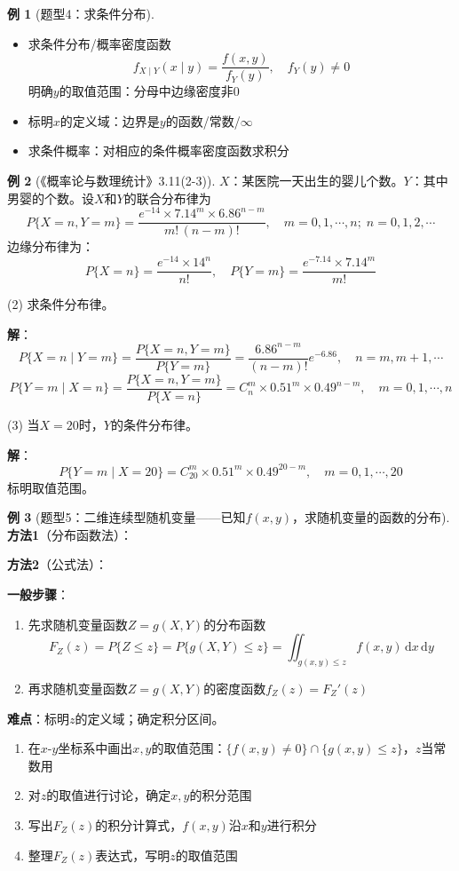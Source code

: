\documentclass[11pt,a4paper]{report}
\theoremstyle{definition}
\newtheorem{example}{例}[chapter]
\theoremstyle{plain}
\begin{document}
\begin{example}[题型4：求条件分布]
\begin{itemize}[leftmargin=2em]
    \item 求条件分布/概率密度函数
    \[
    f_{X\mid Y}(x\mid y)=\frac{f(x,y)}{f_Y(y)},\quad f_Y(y)\neq 0
    \]
    明确\(y\)的取值范围：分母中边缘密度非0
    \item 标明\(x\)的定义域：边界是\(y\)的函数/常数/\(\infty\)
    \item 求条件概率：对相应的条件概率密度函数求积分
\end{itemize}
\end{example}

\begin{example}[《概率论与数理统计》3.11(2-3)]
\(X\)：某医院一天出生的婴儿个数。\(Y\)：其中男婴的个数。设\(X\)和\(Y\)的联合分布律为
\[
P\{X=n,Y=m\}=\frac{e^{-14}\times 7.14^m\times 6.86^{n-m}}{m!\,(n-m)!},\quad m=0,1,\cdots,n;\;n=0,1,2,\cdots
\]
边缘分布律为：
\[
P\{X=n\}=\frac{e^{-14}\times 14^n}{n!},\quad P\{Y=m\}=\frac{e^{-7.14}\times 7.14^m}{m!}
\]

(2) 求条件分布律。

\textbf{解}：
\[
P\{X=n\mid Y=m\}=\frac{P\{X=n,Y=m\}}{P\{Y=m\}}=\frac{6.86^{n-m}}{(n-m)!}e^{-6.86},\quad n=m,m+1,\cdots
\]
\[
P\{Y=m\mid X=n\}=\frac{P\{X=n,Y=m\}}{P\{X=n\}}=C_n^m\times 0.51^m\times 0.49^{n-m},\quad m=0,1,\cdots,n
\]

(3) 当\(X=20\)时，\(Y\)的条件分布律。

\textbf{解}：
\[
P\{Y=m\mid X=20\}=C_{20}^m\times 0.51^m\times 0.49^{20-m},\quad m=0,1,\cdots,20
\]
标明取值范围。
\end{example}

\begin{example}[题型5：二维连续型随机变量——已知\(f(x,y)\)，求随机变量的函数的分布]

\textbf{方法1}（分布函数法）：

\textbf{方法2}（公式法）：

\textbf{一般步骤}：
\begin{enumerate}[label=\arabic*.,leftmargin=2em]
    \item 先求随机变量函数\(Z=g(X,Y)\)的分布函数
    \[
    F_Z(z)=P\{Z\leq z\}=P\{g(X,Y)\leq z\}=\iint_{g(x,y)\leq z}f(x,y)\,\mathrm{d}x\,\mathrm{d}y
    \]
    \item 再求随机变量函数\(Z=g(X,Y)\)的密度函数\(f_Z(z)=F_Z'(z)\)
\end{enumerate}

\textbf{难点}：标明\(z\)的定义域；确定积分区间。
\begin{enumerate}[label=\arabic*.,leftmargin=2em]
    \item 在\(x\)-\(y\)坐标系中画出\(x,y\)的取值范围：\(\{f(x,y)\neq 0\}\cap\{g(x,y)\leq z\}\)，\(z\)当常数用
    \item 对\(z\)的取值进行讨论，确定\(x,y\)的积分范围
    \item 写出\(F_Z(z)\)的积分计算式，\(f(x,y)\)沿\(x\)和\(y\)进行积分
    \item 整理\(F_Z(z)\)表达式，写明\(z\)的取值范围
\end{enumerate}
\end{example}
\end{document}
